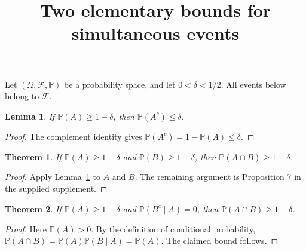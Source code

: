 \documentclass{article}
\newtheorem{lemma}{Lemma}
\newtheorem{theorem}{Theorem}
\begin{document}
\title{Two elementary bounds for simultaneous events}
\maketitle
Let $(\Omega,\mathcal F,\mathbb P)$ be a probability space, and let
$0<\delta<1/2$. All events below belong to $\mathcal F$.

\begin{lemma}\label{lem:complement}
If $\mathbb P(A)\ge1-\delta$, then $\mathbb P(A^c)\le\delta$.
\end{lemma}
\begin{proof}
The complement identity gives $\mathbb P(A^c)=1-\mathbb P(A)\le\delta$.
\end{proof}

\begin{theorem}\label{thm:joint}
If $\mathbb P(A)\ge1-\delta$ and $\mathbb P(B)\ge1-\delta$, then
$\mathbb P(A\cap B)\ge1-\delta$.
\end{theorem}
\begin{proof}
Apply Lemma~\ref{lem:complement} to $A$ and $B$.
The remaining argument is Proposition 7 in the supplied supplement.
\end{proof}

\begin{theorem}\label{thm:conditional}
If $\mathbb P(A)\ge1-\delta$ and $\mathbb P(B^c\mid A)=0$, then
$\mathbb P(A\cap B)\ge1-\delta$.
\end{theorem}
\begin{proof}
Here $\mathbb P(A)>0$. By the definition of conditional probability,
$\mathbb P(A\cap B)=\mathbb P(A)\mathbb P(B\mid A)=\mathbb P(A)$.
The claimed bound follows.
\end{proof}
\end{document}
